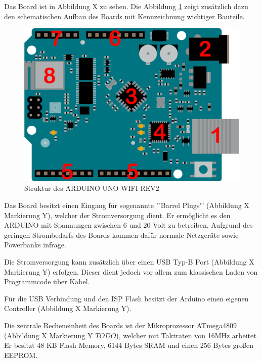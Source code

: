 \documentclass[
    load-dhbw-templates,
    load-preamble = true,
    auto-intro-pages = all,
    add-tocs-to-toc,
    debug = true,
    language = english,
    mainlanguage = ngerman,
    add-bibliography,
    bib-file = dhbw-source.bib,
    biblatex/style = alphabetic, 
]{iodhbwm}
\begin{document}
        Das Board ist in Abbildung X zu sehen.%
        Die Abbildung \ref{fig:ARDUINOUNOSketch} zeigt zusätzlich dazu den schematischen Aufbau des Boards mit Kennzeichnung wichtiger Bauteile.
       

        \begin{figure}[H]
            \centering
            \includegraphics[scale=0.25]{../Quellenangaben/Dokumente/ARDUINO UNO REV2 Dokumentation/unorev2_edited.png}
            \caption[ARDUINOUNOSketch]{Struktur des ARDUINO UNO WIFI REV2 \footnotemark}
            \label{fig:ARDUINOUNOSketch} 
        \end{figure}
            

        Das Board besitzt einen Eingang für sogenannte "'Barrel Plugs"' (Abbildung X Markierung Y), welcher der Stromversorgung dient. Er ermöglicht es den ARDUINO mit Spannungen zwischen 6 und 20 Volt zu betreiben. Aufgrund des geringen Strombedarfs des Boards kommen dafür normale Netzgeräte sowie Powerbanks infrage.
        
        Die Stromversorgung kann zusätzlich über einen USB Typ-B Port (Abbildung X Markierung Y) erfolgen. Dieser dient jedoch vor allem zum klassischen Laden von Programmcode über Kabel. 

        Für die USB Verbindung und den ISP Flash besitzt der Arduino einen eigenen Controller (Abbildung X Markierung Y).

        Die zentrale Recheneinheit des Boards ist der Mikroprozessor ATmega4809 (Abbildung X Markierung Y $TODO$), welcher mit Taktraten von 16MHz arbeitet. Er besitzt 48 KB Flash Memory, 6144 Bytes SRAM und einen 256 Bytes großen EEPROM. %
\end{document}
